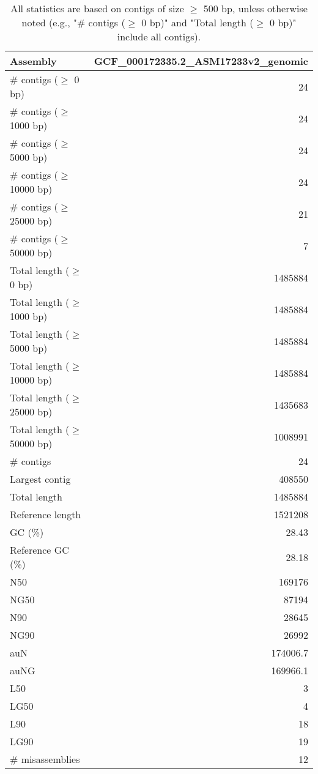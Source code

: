 \documentclass[12pt,a4paper]{article}
\begin{document}
\begin{table}[ht]
\begin{center}
\caption{All statistics are based on contigs of size $\geq$ 500 bp, unless otherwise noted (e.g., "\# contigs ($\geq$ 0 bp)" and "Total length ($\geq$ 0 bp)" include all contigs).}
\begin{tabular}{|l*{1}{|r}|}
\hline
Assembly & GCF\_000172335.2\_ASM17233v2\_genomic \\ \hline
\# contigs ($\geq$ 0 bp) & 24 \\ \hline
\# contigs ($\geq$ 1000 bp) & 24 \\ \hline
\# contigs ($\geq$ 5000 bp) & 24 \\ \hline
\# contigs ($\geq$ 10000 bp) & 24 \\ \hline
\# contigs ($\geq$ 25000 bp) & 21 \\ \hline
\# contigs ($\geq$ 50000 bp) & 7 \\ \hline
Total length ($\geq$ 0 bp) & 1485884 \\ \hline
Total length ($\geq$ 1000 bp) & 1485884 \\ \hline
Total length ($\geq$ 5000 bp) & 1485884 \\ \hline
Total length ($\geq$ 10000 bp) & 1485884 \\ \hline
Total length ($\geq$ 25000 bp) & 1435683 \\ \hline
Total length ($\geq$ 50000 bp) & 1008991 \\ \hline
\# contigs & 24 \\ \hline
Largest contig & 408550 \\ \hline
Total length & 1485884 \\ \hline
Reference length & 1521208 \\ \hline
GC (\%) & 28.43 \\ \hline
Reference GC (\%) & 28.18 \\ \hline
N50 & 169176 \\ \hline
NG50 & 87194 \\ \hline
N90 & 28645 \\ \hline
NG90 & 26992 \\ \hline
auN & 174006.7 \\ \hline
auNG & 169966.1 \\ \hline
L50 & 3 \\ \hline
LG50 & 4 \\ \hline
L90 & 18 \\ \hline
LG90 & 19 \\ \hline
\# misassemblies & 12 \\ \hline

\end{tabular}
\end{center}
\end{table}
\end{document}
